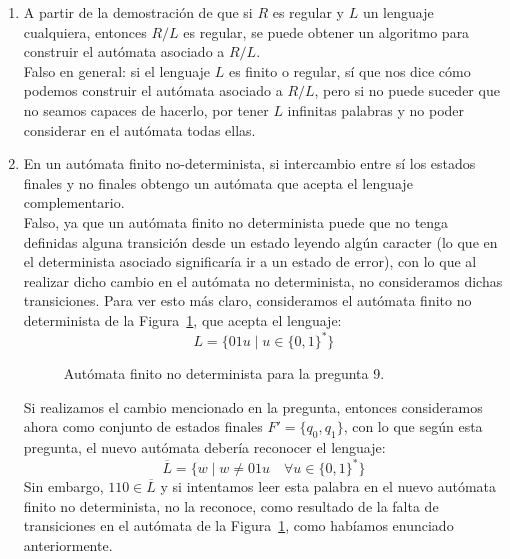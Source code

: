 \begin{enumerate}
    \item A partir de la demostración de que si $R$ es regular y $L$ un lenguaje cualquiera, entonces $R/L$ es regular, se puede obtener un algoritmo para construir el autómata asociado a $R/L$.\\

        Falso en general: si el lenguaje $L$ es finito o regular, sí que nos dice cómo podemos construir el autómata asociado a $R/L$, pero si no puede suceder que no seamos capaces de hacerlo, por tener $L$ infinitas palabras y no poder considerar en el autómata todas ellas.
    \item En un autómata finito no-determinista, si intercambio entre sí los estados finales y no finales obtengo un autómata que acepta el lenguaje complementario.\\

        Falso, ya que un autómata finito no determinista puede que no tenga definidas alguna transición desde un estado leyendo algún caracter (lo que en el determinista asociado significaría ir a un estado de error), con lo que al realizar dicho cambio en el autómata no determinista, no consideramos dichas transiciones. Para ver esto más claro, consideramos el autómata finito no determinista de la Figura~\ref{fig:tipo_test9}, que acepta el lenguaje:
        \begin{equation*}
            L = \{01u \mid u \in {\{0,1\}}^{\ast}\}
        \end{equation*}

        \begin{figure}[H]
           \centering
           \caption{Autómata finito no determinista para la pregunta 9.}
           \label{fig:tipo_test9}
       \end{figure}
       Si realizamos el cambio mencionado en la pregunta, entonces consideramos ahora como conjunto de estados finales $F' = \{q_0,q_1\}$, con lo que según esta pregunta, el nuevo autómata debería reconocer el lenguaje: 
       \begin{equation*}
           \overline{L}= \{w \mid w \neq 01u \quad \forall u\in {\{0,1\}}^{\ast}\}
       \end{equation*}
       Sin embargo, $110 \in \overline{L}$ y si intentamos leer esta palabra en el nuevo autómata finito no determinista, no la reconoce, como resultado de la falta de transiciones en el autómata de la Figura~\ref{fig:tipo_test9}, como habíamos enunciado anteriormente.


\end{enumerate}
